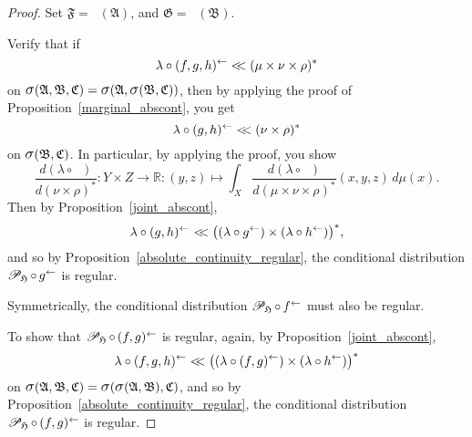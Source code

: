 \documentclass[
twoside=true,
paper=letter,
fontsize=9pt,
pagesize=auto,
leqno,
openany,
headsepline,
overfullrule,
]{scrbook}
\theoremstyle{plain}
\theoremstyle{plain}
\theoremstyle{definition}
\theoremstyle{bfnoteitalic}
\theoremstyle{bfnoteroman}
\newcommand{\sigalg}[1]{\mathfrak{#1}}
\newcommand{\cali}[1]{\mathscr{#1}}
\newcommand{\condprobop}[1]{\mathop{\cali{P}\hspace{-1pt}}\nolimits_{#1}}
\newcommand{\sagb}{\mathop{\hbox{\large{$\sigma$}}}\nolimits}
\newcommand{\preimage}[1]{\mathop{#1^{\leftarrow}}}
\newcommand{\R}{\mathbb{R}}
\newcommand{\sigmaalgebra}{\sigalg{A}}
\newcommand{\sigmaalgebraii}{\sigalg{B}}
\newcommand{\sigmaalgebraiii}{\sigalg{C}}
\newcommand{\productsig}[2]{\sagb(#1,#2)}
\newcommand{\funcf}{f}
\newcommand{\funcg}{g}
\newcommand{\funch}{h}
\newcommand{\function}{f}
\newcommand{\functionii}{g}
\newcommand{\functioniii}{h}
\newcommand{\measurespace}{X}
\newcommand{\measurespaceii}{Y}
\newcommand{\measurespaceiii}{Z}
\newcommand{\mspaceelt}{x}
\newcommand{\mspaceeltii}{y}
\newcommand{\mspaceeltiii}{z}
\newcommand{\abscont}{\mathrel{< \kern-3.5pt <}}
\newcommand{\measmu}{\mu}
\newcommand{\measnu}{\nu}
\newcommand{\measlambda}{\lambda}
\newcommand{\measrho}{\rho}
\begin{document}
\begin{proof}
Set
$\sigalg{F}=\preimage{\funcf}(\sigmaalgebra)$,
and $\sigalg{G}=\preimage{\funcg}(\sigmaalgebraii)$.


Verify that if
\[
\measlambda\circ\preimage{(\function,\functionii,\functioniii)}
\abscont
(\measmu\times\measnu\times\measrho)^*
\]
on
$\productsig{\sigmaalgebra}{\sigmaalgebraii,\sigmaalgebraiii}
=
\productsig{\sigmaalgebra}{\productsig{\sigmaalgebraii}{\sigmaalgebraiii}}$,
then by applying the proof of Proposition~\ref{marginal_abscont}, you get
\[
\measlambda\circ \preimage{(\funcg,\funch)}
\abscont
(\measnu\times\measrho)^*
\]
on
$\productsig{\sigmaalgebraii}{\sigmaalgebraiii}$.
In particular, by applying the proof, you show
\[
\frac{d(\measlambda\circ \preimage{(\funcg,\funch)})}{d(\measnu\times\measrho)^*}
:\measurespaceii\times\measurespaceiii \to  \R
:(\mspaceeltii,\mspaceeltiii)\mapsto
\int_\measurespace
\frac{d(\measlambda\circ\preimage{(\function,\functionii,\functioniii)})}
{d(\measmu\times\measnu\times\measrho)^*}
(\mspaceelt,\mspaceeltii,\mspaceeltiii)\,d\measmu(\mspaceelt).
\]
Then by Proposition~\ref{joint_abscont},
\[
\measlambda\circ \preimage{(\funcg,\funch)}
\abscont
\bigl((\measlambda\circ\preimage{\funcg})
\times
(\measlambda\circ\preimage{\funch})\bigr)^*,
\]
and so by Proposition~\ref{absolute_continuity_regular},
the conditional distribution
$\condprobop{\sigalg{H}}\circ \preimage{\funcg}$
is regular.

Symmetrically, the conditional distribution
$\condprobop{\sigalg{H}}\circ \preimage{\funcf}$
must also be regular.

To show that
$\condprobop{\sigalg{H}} \circ \preimage{(\funcf,\funcg)}$
is regular, again, by Proposition~\ref{joint_abscont},
\[
\measlambda\circ \preimage{(\funcf, \funcg, \funch)}
\abscont
\bigl((\measlambda\circ\preimage{(\funcf,\funcg)})
\times
(\measlambda\circ\preimage{\funch})\bigr)^*
\]
on
$\productsig{\sigmaalgebra}{\sigmaalgebraii,\sigmaalgebraiii}
=
\productsig{\productsig{\sigmaalgebra}{\sigmaalgebraii}}{\sigmaalgebraiii}$,
and so by Proposition~\ref{absolute_continuity_regular},
the conditional distribution
$\condprobop{\sigalg{H}}\circ \preimage{(\funcf,\funcg)}$
is regular.
\end{proof}
\end{document}
